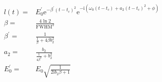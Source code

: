 \documentclass{article}
\newcommand{\E}{\ensuremath{\mathrm{e}}}
\newcommand{\I}{\ensuremath{\mathrm{i}}}
\begin{document}
\begin{align}
  l(t)=&
  E_0^\prime
  \E^{-\beta^\prime(t-t_c)^2}
  \E^{-\I\left(
    \omega_0(t-t_c)+a_2(t-t_c)^2+\phi
  \right)}\nonumber\\
  \beta=&\frac{4\ln 2}{\mathrm{FWHM}^2}\nonumber\\
  \beta^\prime=&\frac{1}{\frac{1}{\beta}+4\beta b_2^2}\nonumber\\
  a_2=&\frac{b_2}{\frac{1}{4\beta^2}+b^2_2}\nonumber\\
  E_0^\prime=&E_0\sqrt{\frac{1}{2\I b_2\beta+1}}
\nonumber\end{align}
\end{document}
